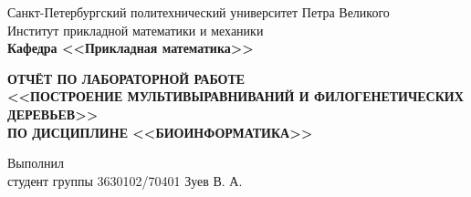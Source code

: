\documentclass[main.tex]{subfiles}
\begin{document}
\begin{titlepage}
\begin{center}
	\begin{large}
		Санкт-Петербургский политехнический университет Петра Великого\\
		Институт прикладной математики и механики\\
		\textbf{Кафедра <<Прикладная математика>>}\\
	\end{large}
	\vfill
	\Large{\textbf{ОТЧЁТ ПО ЛАБОРАТОРНОЙ РАБОТЕ\\
	<<ПОСТРОЕНИЕ МУЛЬТИВЫРАВНИВАНИЙ И ФИЛОГЕНЕТИЧЕСКИХ ДЕРЕВЬЕВ>>\\
	ПО ДИСЦИПЛИНЕ <<БИОИНФОРМАТИКА>>}}
\end{center}
\vfill
\flushleft
Выполнил\\
студент группы 3630102/70401
\flushright
Зуев В. А.\\
\flushleft
\vfill
{}
\end{titlepage}
\end{document}
